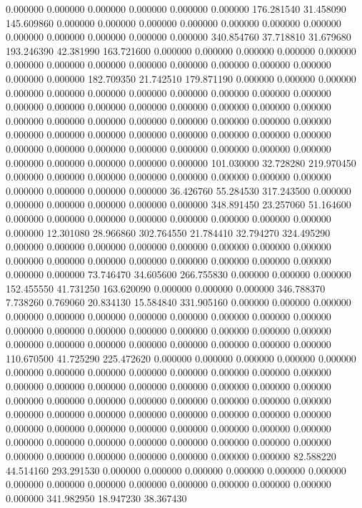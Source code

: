 0.000000 0.000000 0.000000
0.000000 0.000000 0.000000
176.281540 31.458090 145.609860
0.000000 0.000000 0.000000
0.000000 0.000000 0.000000
0.000000 0.000000 0.000000
0.000000 0.000000 0.000000
340.854760 37.718810 31.679680
193.246390 42.381990 163.721600
0.000000 0.000000 0.000000
0.000000 0.000000 0.000000
0.000000 0.000000 0.000000
0.000000 0.000000 0.000000
0.000000 0.000000 0.000000
182.709350 21.742510 179.871190
0.000000 0.000000 0.000000
0.000000 0.000000 0.000000
0.000000 0.000000 0.000000
0.000000 0.000000 0.000000
0.000000 0.000000 0.000000
0.000000 0.000000 0.000000
0.000000 0.000000 0.000000
0.000000 0.000000 0.000000
0.000000 0.000000 0.000000
0.000000 0.000000 0.000000
0.000000 0.000000 0.000000
0.000000 0.000000 0.000000
0.000000 0.000000 0.000000
0.000000 0.000000 0.000000
0.000000 0.000000 0.000000
0.000000 0.000000 0.000000
101.030000 32.728280 219.970450
0.000000 0.000000 0.000000
0.000000 0.000000 0.000000
0.000000 0.000000 0.000000
0.000000 0.000000 0.000000
36.426760 55.284530 317.243500
0.000000 0.000000 0.000000
0.000000 0.000000 0.000000
348.891450 23.257060 51.164600
0.000000 0.000000 0.000000
0.000000 0.000000 0.000000
0.000000 0.000000 0.000000
12.301080 28.966860 302.764550
21.784410 32.794270 324.495290
0.000000 0.000000 0.000000
0.000000 0.000000 0.000000
0.000000 0.000000 0.000000
0.000000 0.000000 0.000000
0.000000 0.000000 0.000000
0.000000 0.000000 0.000000
73.746470 34.605600 266.755830
0.000000 0.000000 0.000000
152.455550 41.731250 163.620090
0.000000 0.000000 0.000000
346.788370 7.738260 0.769060
20.834130 15.584840 331.905160
0.000000 0.000000 0.000000
0.000000 0.000000 0.000000
0.000000 0.000000 0.000000
0.000000 0.000000 0.000000
0.000000 0.000000 0.000000
0.000000 0.000000 0.000000
0.000000 0.000000 0.000000
0.000000 0.000000 0.000000
0.000000 0.000000 0.000000
110.670500 41.725290 225.472620
0.000000 0.000000 0.000000
0.000000 0.000000 0.000000
0.000000 0.000000 0.000000
0.000000 0.000000 0.000000
0.000000 0.000000 0.000000
0.000000 0.000000 0.000000
0.000000 0.000000 0.000000
0.000000 0.000000 0.000000
0.000000 0.000000 0.000000
0.000000 0.000000 0.000000
0.000000 0.000000 0.000000
0.000000 0.000000 0.000000
0.000000 0.000000 0.000000
0.000000 0.000000 0.000000
0.000000 0.000000 0.000000
0.000000 0.000000 0.000000
0.000000 0.000000 0.000000
0.000000 0.000000 0.000000
0.000000 0.000000 0.000000
0.000000 0.000000 0.000000
82.588220 44.514160 293.291530
0.000000 0.000000 0.000000
0.000000 0.000000 0.000000
0.000000 0.000000 0.000000
0.000000 0.000000 0.000000
0.000000 0.000000 0.000000
341.982950 18.947230 38.367430
